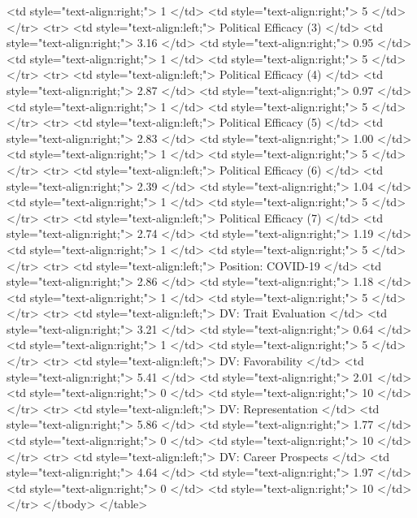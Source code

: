    <td style="text-align:right;"> 1 </td>
   <td style="text-align:right;"> 5 </td>
  </tr>
  <tr>
   <td style="text-align:left;"> Political Efficacy (3) </td>
   <td style="text-align:right;"> 3.16 </td>
   <td style="text-align:right;"> 0.95 </td>
   <td style="text-align:right;"> 1 </td>
   <td style="text-align:right;"> 5 </td>
  </tr>
  <tr>
   <td style="text-align:left;"> Political Efficacy (4) </td>
   <td style="text-align:right;"> 2.87 </td>
   <td style="text-align:right;"> 0.97 </td>
   <td style="text-align:right;"> 1 </td>
   <td style="text-align:right;"> 5 </td>
  </tr>
  <tr>
   <td style="text-align:left;"> Political Efficacy (5) </td>
   <td style="text-align:right;"> 2.83 </td>
   <td style="text-align:right;"> 1.00 </td>
   <td style="text-align:right;"> 1 </td>
   <td style="text-align:right;"> 5 </td>
  </tr>
  <tr>
   <td style="text-align:left;"> Political Efficacy (6) </td>
   <td style="text-align:right;"> 2.39 </td>
   <td style="text-align:right;"> 1.04 </td>
   <td style="text-align:right;"> 1 </td>
   <td style="text-align:right;"> 5 </td>
  </tr>
  <tr>
   <td style="text-align:left;"> Political Efficacy (7) </td>
   <td style="text-align:right;"> 2.74 </td>
   <td style="text-align:right;"> 1.19 </td>
   <td style="text-align:right;"> 1 </td>
   <td style="text-align:right;"> 5 </td>
  </tr>
  <tr>
   <td style="text-align:left;"> Position: COVID-19 </td>
   <td style="text-align:right;"> 2.86 </td>
   <td style="text-align:right;"> 1.18 </td>
   <td style="text-align:right;"> 1 </td>
   <td style="text-align:right;"> 5 </td>
  </tr>
  <tr>
   <td style="text-align:left;"> DV: Trait Evaluation </td>
   <td style="text-align:right;"> 3.21 </td>
   <td style="text-align:right;"> 0.64 </td>
   <td style="text-align:right;"> 1 </td>
   <td style="text-align:right;"> 5 </td>
  </tr>
  <tr>
   <td style="text-align:left;"> DV: Favorability </td>
   <td style="text-align:right;"> 5.41 </td>
   <td style="text-align:right;"> 2.01 </td>
   <td style="text-align:right;"> 0 </td>
   <td style="text-align:right;"> 10 </td>
  </tr>
  <tr>
   <td style="text-align:left;"> DV: Representation </td>
   <td style="text-align:right;"> 5.86 </td>
   <td style="text-align:right;"> 1.77 </td>
   <td style="text-align:right;"> 0 </td>
   <td style="text-align:right;"> 10 </td>
  </tr>
  <tr>
   <td style="text-align:left;"> DV: Career Prospects </td>
   <td style="text-align:right;"> 4.64 </td>
   <td style="text-align:right;"> 1.97 </td>
   <td style="text-align:right;"> 0 </td>
   <td style="text-align:right;"> 10 </td>
  </tr>
</tbody>
</table>
